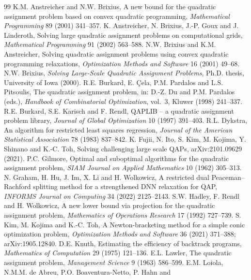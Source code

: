 \documentclass[10pt]{article}
\theoremstyle{remark}
\begin{document}
{\small
\begin{thebibliography}{99}
 K.M. Anstreicher and N.W. Brixius, A new bound for the quadratic
  assignment problem based on convex quadratic programming, \emph{Mathematical
  Programming} 89 (2001) 341--357.
 K. Anstreicher, N. Brixius, J.-P. Goux and J. Linderoth, Solving large
  quadratic assignment problems on computational grids, \emph{Mathematical
  Programming} 91 (2002) 563--588.
 N.W. Brixius and K.M. Anstreicher, Solving quadratic assignment
  problems using convex quadratic programming relaxations, \emph{Optimization
  Methods and Software} 16 (2001) 49--68.
 N.W. Brixius, \emph{Solving Large-Scale Quadratic Assignment
  Problems}, Ph.D. thesis, University of Iowa (2000).
 R.E. Burkard, E. \c{C}ela, P.M. Pardalos and L.S. Pitsoulis,
  The quadratic assignment problem, in: D.-Z. Du and P.M. Pardalos (eds.),
  \emph{Handbook of Combinatorial Optimization}, vol.~3, Kluwer (1998) 241--337.
 R.E. Burkard, S.E. Karisch and F. Rendl, QAPLIB -- a quadratic
  assignment problem library, \emph{Journal of Global Optimization} 10 (1997) 391--403.
 R.L. Dykstra, An algorithm for restricted least squares regression,
  \emph{Journal of the American Statistical Association} 78 (1983) 837--842.
 K. Fujii, N. Ito, S. Kim, M. Kojima, Y. Shinano and K.-C. Toh, Solving
  challenging large scale QAPs, arXiv:2101.09629 (2021).
 P.C. Gilmore, Optimal and suboptimal algorithms for the quadratic
  assignment problem, \emph{SIAM Journal on Applied Mathematics} 10 (1962) 305--313.
 N. Graham, H. Hu, J. Im, X. Li and H. Wolkowicz, A restricted dual
  Peaceman--Rachford splitting method for a strengthened DNN relaxation for QAP,
  \emph{INFORMS Journal on Computing} 34 (2022) 2125--2143.
 S.W. Hadley, F. Rendl and H. Wolkowicz, A new lower bound via projection
  for the quadratic assignment problem, \emph{Mathematics of Operations Research} 17
  (1992) 727--739.
 S. Kim, M. Kojima and K.-C. Toh, A Newton-bracketing method for a simple
  conic optimization problem, \emph{Optimization Methods and Software} 36 (2021)
  371--388; arXiv:1905.12840.
 D.E. Knuth, Estimating the efficiency of backtrack programs,
  \emph{Mathematics of Computation} 29 (1975) 121--136.
 E.L. Lawler, The quadratic assignment problem, \emph{Management
  Science} 9 (1963) 586--599.
 E.M. Loiola, N.M.M. de Abreu, P.O. Boaventura-Netto, P. Hahn and

\end{thebibliography}}
\end{document}
